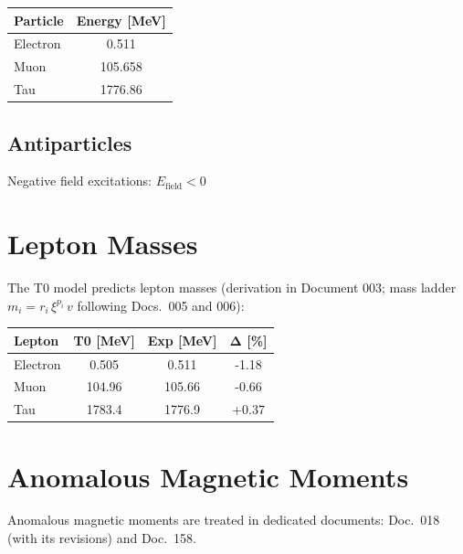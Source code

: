 	\begin{table}[h]
		\centering
		\begin{tabular}{lc}
			\hline
			\textbf{Particle} & \textbf{Energy [MeV]} \\
			\hline
			Electron & 0.511 \\
			Muon & 105.658 \\
			Tau & 1776.86 \\
			\hline
		\end{tabular}
	\end{table}
	
	\subsection{Antiparticles}
	
	Negative field excitations: $E_{\text{field}} < 0$
	
	\section{Lepton Masses}
	\label{sec:lepton_masses}
	
	The T0 model predicts lepton masses (derivation in Document 003; mass ladder $m_i = r_i\,\xi^{p_i}\,v$ following Docs.~005 and 006):
	
	\begin{table}[h]
		\centering
		\begin{tabular}{lccc}
			\hline
			\textbf{Lepton} & \textbf{T0 [MeV]} & \textbf{Exp [MeV]} & \textbf{Δ [\%]} \\
			\hline
			Electron & 0.505 & 0.511 & -1.18 \\
			Muon & 104.96 & 105.66 & -0.66 \\
			Tau & 1783.4 & 1776.9 & +0.37 \\
			\hline
		\end{tabular}
	\end{table}
	
	\section{Anomalous Magnetic Moments}
	\label{sec:g2}

	Anomalous magnetic moments are treated in dedicated documents: Doc.~018 (with its revisions) and Doc.~158.

